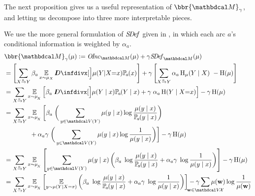 \begin{subappendices}
The next proposition gives us a useful representation of $\bbr{\dg M}_\gamma$,
and letting us decompose into three more interpretable pieces.
\begin{lproof}\label{proof:nice-score}
\allowdisplaybreaks
We use the more general formulation of $\mathit{S\mskip-3.5muD\mskip-2.5mue\mskip-1.5muf}$ given
in , in which each arc $a$'s conditional  
information is weighted by $\alpha_a$.
  \begin{align*}
	&\bbr{\dg M}_\gamma(\mu) := \OInc_{\dg M}( \mu) + \gamma \SDef_{\dg M}(\mu) \\
		&= \left[\sum\alle \beta_a \Ex_{x\sim \mu_X}\kldiv[\Big]{ \mu(Y | X {=} x) }{\p_a(x) } \right]  + \gamma \left[\sum\alle \alpha_a \H_\mu(Y\mid X) ~-\H(\mu)\right]\\
		&= \sum\alle 
			\Ex_{x \sim \mu_{\!_X}}  \left[ \beta_a\; \kldiv[\Big]{ \mu(Y \mid x) }{\p_a(Y \mid x) } + \gamma \; \alpha_a \H(Y \mid X{=} x) \right]  - \gamma \H(\mu) \\ 
		&= \sum\alle 
			\Ex_{x \sim \mu_{\!_X}}  \bigg[ \beta_a\; \bigg(\sum_{y \in \V(Y)} \mu(y \mid x) \log\frac{\mu(y\mid x)}{\p_a(y\mid x)}\bigg) 
                \\&\qquad\qquad
                + \alpha_a\gamma \; \bigg(\sum_{y \in \V(Y)} \mu(y\mid x) \log \frac{1}{\mu(y\mid x)} \bigg) \bigg]  - \gamma  \H(\mu) \\ 
		&= \sum\alle 
			\Ex_{x \sim \mu_{\!_X}}  \left[ \sum_{y \in \V(Y)} \mu(y \mid x) \left(  \beta_a\; \log\frac{\mu(y\mid x)}{\p_a(y\mid x)} + \alpha_a \gamma \; \log \frac{1}{\mu(y\mid x)} \right) \right]  - \gamma  \H(\mu) \\
		&= \sum\alle 
			\Ex_{x \sim \mu_{\!_X}}  \left[ \Ex_{y \sim \mu(Y \mid X=x)} \left(  \beta_a\; \log\frac{\mu(y\mid x)}{\p_a(y\mid x)} + \alpha_a \gamma \; \log \frac{1}{\mu(y\mid x)} \right) \right]  - \gamma \sum_{\mathclap{\mat w \in \V\!\X}} \mu(\mat w) \log \frac{1}{\mu(\mat w)} \\  

\end{align*}
\end{lproof}
\end{subappendices}
